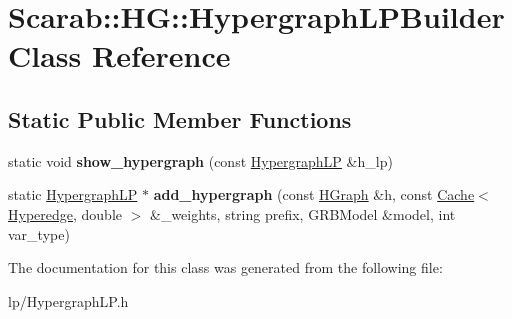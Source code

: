 \hypertarget{class_scarab_1_1_h_g_1_1_hypergraph_l_p_builder}{
\section{Scarab::HG::HypergraphLPBuilder Class Reference}
\label{class_scarab_1_1_h_g_1_1_hypergraph_l_p_builder}
}
\subsection*{Static Public Member Functions}
\begin{DoxyCompactItemize}
\item 
\hypertarget{class_scarab_1_1_h_g_1_1_hypergraph_l_p_builder_a7653a6f997f1505c0d6668618b28d6d8}{
static void {\bfseries show\_\-hypergraph} (const \hyperlink{struct_scarab_1_1_h_g_1_1_hypergraph_l_p}{HypergraphLP} \&h\_\-lp)}
\label{class_scarab_1_1_h_g_1_1_hypergraph_l_p_builder_a7653a6f997f1505c0d6668618b28d6d8}

\item 
\hypertarget{class_scarab_1_1_h_g_1_1_hypergraph_l_p_builder_a3a711a79152e0f5d4cc9157737673b95}{
static \hyperlink{struct_scarab_1_1_h_g_1_1_hypergraph_l_p}{HypergraphLP} $\ast$ {\bfseries add\_\-hypergraph} (const \hyperlink{class_scarab_1_1_h_g_1_1_h_graph}{HGraph} \&h, const \hyperlink{class_cache}{Cache}$<$ \hyperlink{class_scarab_1_1_h_g_1_1_hyperedge}{Hyperedge}, double $>$ \&\_\-weights, string prefix, GRBModel \&model, int var\_\-type)}
\label{class_scarab_1_1_h_g_1_1_hypergraph_l_p_builder_a3a711a79152e0f5d4cc9157737673b95}

\end{DoxyCompactItemize}


The documentation for this class was generated from the following file:\begin{DoxyCompactItemize}
\item 
lp/HypergraphLP.h\end{DoxyCompactItemize}
